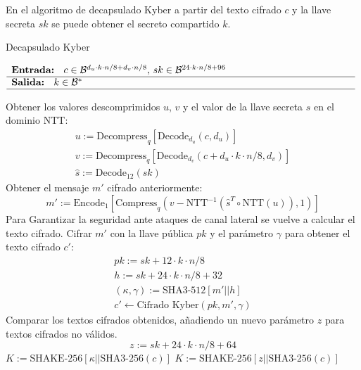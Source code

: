 En el algoritmo de decapsulado Kyber a partir del texto cifrado \(c\)  y la llave secreta \(sk\) se puede obtener el secreto compartido \(k\).
\begin{algorithm}[H]
	\small
	\caption{Decapsulado Kyber}
	$\begin{array}{p{\textwidth}}
		\textbf{Entrada: } \(c\in \mathcal{B}^{d_u\cdot k\cdot n/8+d_v\cdot n/8}\), \(sk\in \mathcal{B}^{24\cdot k\cdot n/8+96}\)\\ 
		\hline
		\textbf{Salida: } \(k\in \mathcal{B}^{*}\)\\ 
		\hline
	\end{array}$
	\begin{algorithmic}[1]
		\State Obtener los valores descomprimidos \(u\), \(v\) y el valor de la llave secreta \(s\) en el dominio NTT:
		\begin{equation}
			\begin{array}{l}
				u:=\text{Decompress}_q[\text{Decode}_{d_u}(c,d_u)]\\
				v:=\text{Decompress}_q[\text{Decode}_{d_v}(c+d_u\cdot k\cdot n/8,d_v)]\\
				\hat{s}:=\text{Decode}_{12}(sk)
			\end{array}
		\end{equation}
		\State Obtener el mensaje \(m'\) cifrado anteriormente:
		\begin{equation}
			m':=\text{Encode}_1[\text{Compress}_q\left(v-\text{NTT}^{-1}(\hat{s}^T\circ \text{NTT}(u)),1\right)]
		\end{equation}
		\Statex Para Garantizar la seguridad ante ataques de canal lateral se vuelve a calcular el texto cifrado.
		\State Cifrar \(m'\) con la llave pública \(pk\) y el parámetro \(\gamma\) para obtener el texto cifrado \(c'\):
		\begin{equation}
			\begin{array}{l}
				pk:=sk+12\cdot k\cdot n/8\\
				h:=sk+24\cdot k\cdot n/8+32\\
				(\kappa, \gamma):=\text{SHA3-512}[m'||h]\\
				c'\gets \text{Cifrado Kyber}(pk,m',\gamma)
			\end{array}
		\end{equation}
		\State Comparar los textos cifrados obtenidos, añadiendo un nuevo parámetro \(z\) para textos cifrados no válidos.
		\begin{equation}
			z:=sk+24\cdot k \cdot n/8 +64
		\end{equation}
		\State \Return \(K:=\text{SHAKE-256}[\kappa||\text{SHA3-256}(c)]\) 
		\Else
		\State \Return \(K:=\text{SHAKE-256}[z||\text{SHA3-256}(c)]\) 
		\EndIf
	\end{algorithmic}
\end{algorithm}



